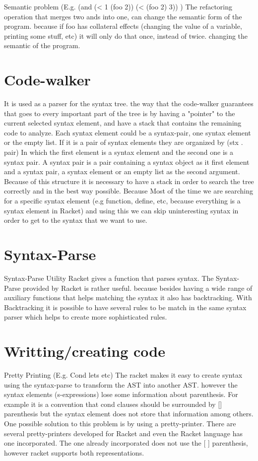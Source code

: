 Semantic problem (E.g. (and (< 1 (foo 2)) (< (foo 2) 3)) )
The refactoring operation that merges two ands into one, can change the semantic
form of the program. because if foo has collateral effects (changing the value of
a variable, printing some stuff, etc) it will only do that once, instead of twice.
changing the semantic of the program.

\section{Code-walker} %
It is used as a parser for the syntax tree.
the way that the code-walker guarantees that goes to every important part of the
tree is by having a "pointer" to the current selected syntax element, and have
a stack that contains the remaining code to analyze.
Each syntax element could be a syntax-pair, one syntax element or the empty list.
If it is a pair of syntax elements they are organized by (stx . pair)
In which the first element is a syntax element and the second one is a syntax pair.
A syntax pair is a pair containing a syntax object as it first element and
a syntax pair, a syntax element or an empty list as the second argument.
Because of this structure it is necessary to have a stack in order to search
the tree correctly and in the best way possible.
Because Most of the time we are searching for a specific syntax element (e.g function,
define, etc, because everything is a syntax element in Racket) and using this we
can skip uninteresting syntax in order to get to the syntax that we want to use.

\section{Syntax-Parse}
Syntax-Parse Utility
Racket gives a function that parses syntax. The Syntax-Parse provided by Racket
is rather useful. because besides having a wide range of auxiliary functions that
helps matching the syntax it also has backtracking. With Backtracking it is
possible to have several rules to be match in the same syntax parser which
helps to create more sophisticated rules.


\section{ Writting/creating code}

Pretty Printing (E.g. Cond lets etc)
The racket makes it easy to create syntax using the syntax-parse to transform the
AST into another AST. however the syntax elements (s-expressions) lose some information
about parenthesis. For example it is a convention that cond clauses should be
surrounded by [] parenthesis but the syntax element does not store that information
 among others. One possible solution to this problem is by using a pretty-printer.
 There are several pretty-printers developed for Racket and even the Racket language
 has one incorporated.
 The one already incorporated does not use the [ ] parenthesis, however racket
 supports both representations.


